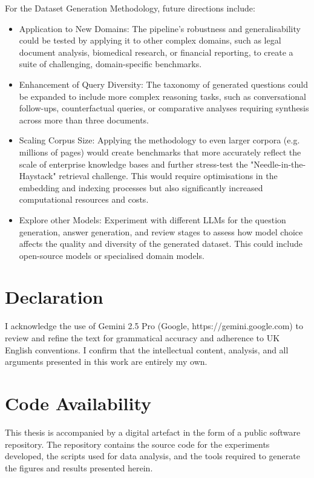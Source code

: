 \documentclass[12pt,twoside]{report}
\begin{document}
For the Dataset Generation Methodology, future directions include:
\begin{itemize}
\item{Application to New Domains}: The pipeline's robustness and generalisability could be tested by applying it to other complex domains, such as legal document analysis, biomedical research, or financial reporting, to create a suite of challenging, domain-specific benchmarks.

\item{Enhancement of Query Diversity}: The taxonomy of generated questions could be expanded to include more complex reasoning tasks, such as conversational follow-ups, counterfactual queries, or comparative analyses requiring synthesis across more than three documents.

\item{Scaling Corpus Size}: Applying the methodology to even larger corpora (e.g. millions of pages) would create benchmarks that more accurately reflect the scale of enterprise knowledge bases and further stress-test the "Needle-in-the-Haystack" retrieval challenge. This would require optimisations in the embedding and indexing processes but also significantly increased computational resources and costs.

\item{Explore other Models}: Experiment with different LLMs for the question generation, answer generation, and review stages to assess how model choice affects the quality and diversity of the generated dataset. This could include open-source models or specialised domain models.
\end{itemize}




\newpage
\section*{Declaration}

I acknowledge the use of Gemini 2.5 Pro (Google, https://gemini.google.com) to review and refine the text for grammatical accuracy and adherence to UK English conventions. I confirm that the intellectual content, analysis, and all arguments presented in this work are entirely my own.


\section*{Code Availability}
This thesis is accompanied by a digital artefact in the form of a public software repository. The repository contains the source code for the experiments developed, the scripts used for data analysis, and the tools required to generate the figures and results presented herein.
\end{document}
